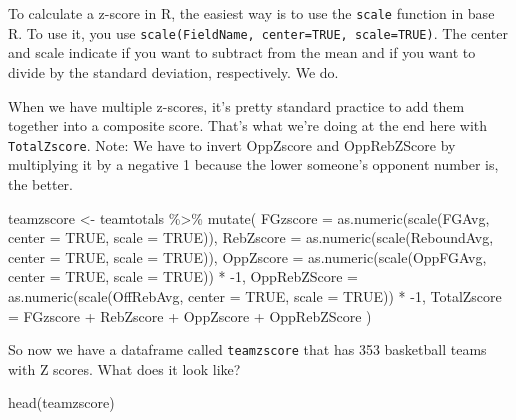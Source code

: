 \documentclass[
]{book}
\newenvironment{Shaded}{\begin{snugshade}}{\end{snugshade}}
\newcommand{\AttributeTok}[1]{\textcolor[rgb]{0.77,0.63,0.00}{#1}}
\newcommand{\ConstantTok}[1]{\textcolor[rgb]{0.00,0.00,0.00}{#1}}
\newcommand{\DecValTok}[1]{\textcolor[rgb]{0.00,0.00,0.81}{#1}}
\newcommand{\FunctionTok}[1]{\textcolor[rgb]{0.00,0.00,0.00}{#1}}
\newcommand{\NormalTok}[1]{#1}
\newcommand{\OtherTok}[1]{\textcolor[rgb]{0.56,0.35,0.01}{#1}}
\newcommand{\SpecialCharTok}[1]{\textcolor[rgb]{0.00,0.00,0.00}{#1}}
\begin{document}
To calculate a z-score in R, the easiest way is to use the \texttt{scale} function in base R. To use it, you use \texttt{scale(FieldName,\ center=TRUE,\ scale=TRUE)}. The center and scale indicate if you want to subtract from the mean and if you want to divide by the standard deviation, respectively. We do.

When we have multiple z-scores, it's pretty standard practice to add them together into a composite score. That's what we're doing at the end here with \texttt{TotalZscore}. Note: We have to invert OppZscore and OppRebZScore by multiplying it by a negative 1 because the lower someone's opponent number is, the better.

\begin{Shaded}
\begin{Highlighting}[]
\NormalTok{teamzscore }\OtherTok{\textless{}{-}}\NormalTok{ teamtotals }\SpecialCharTok{\%\textgreater{}\%} 
  \FunctionTok{mutate}\NormalTok{(}
    \AttributeTok{FGzscore =} \FunctionTok{as.numeric}\NormalTok{(}\FunctionTok{scale}\NormalTok{(FGAvg, }\AttributeTok{center =} \ConstantTok{TRUE}\NormalTok{, }\AttributeTok{scale =} \ConstantTok{TRUE}\NormalTok{)),}
    \AttributeTok{RebZscore =} \FunctionTok{as.numeric}\NormalTok{(}\FunctionTok{scale}\NormalTok{(ReboundAvg, }\AttributeTok{center =} \ConstantTok{TRUE}\NormalTok{, }\AttributeTok{scale =} \ConstantTok{TRUE}\NormalTok{)),}
    \AttributeTok{OppZscore =} \FunctionTok{as.numeric}\NormalTok{(}\FunctionTok{scale}\NormalTok{(OppFGAvg, }\AttributeTok{center =} \ConstantTok{TRUE}\NormalTok{, }\AttributeTok{scale =} \ConstantTok{TRUE}\NormalTok{)) }\SpecialCharTok{*} \SpecialCharTok{{-}}\DecValTok{1}\NormalTok{,}
    \AttributeTok{OppRebZScore =} \FunctionTok{as.numeric}\NormalTok{(}\FunctionTok{scale}\NormalTok{(OffRebAvg, }\AttributeTok{center =} \ConstantTok{TRUE}\NormalTok{, }\AttributeTok{scale =} \ConstantTok{TRUE}\NormalTok{)) }\SpecialCharTok{*} \SpecialCharTok{{-}}\DecValTok{1}\NormalTok{,}
    \AttributeTok{TotalZscore =}\NormalTok{ FGzscore }\SpecialCharTok{+}\NormalTok{ RebZscore }\SpecialCharTok{+}\NormalTok{ OppZscore }\SpecialCharTok{+}\NormalTok{ OppRebZScore}
\NormalTok{  )  }
\end{Highlighting}
\end{Shaded}

So now we have a dataframe called \texttt{teamzscore} that has 353 basketball teams with Z scores. What does it look like?

\begin{Shaded}
\begin{Highlighting}[]
\FunctionTok{head}\NormalTok{(teamzscore)}
\end{Highlighting}
\end{Shaded}
\end{document}
